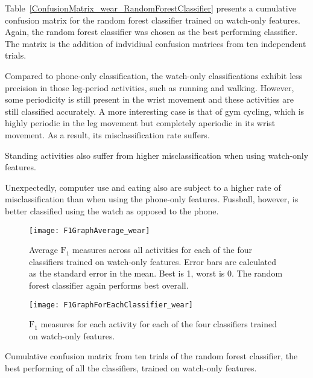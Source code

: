     Table~\ref{ConfusionMatrix_wear_RandomForestClassifier} presents a cumulative confusion matrix for the random forest classifier trained on watch-only features. Again, the random forest classifier was chosen as the best performing classifier. The matrix is the addition of indvidiual confusion matrices from ten independent trials.
    
    Compared to phone-only classification, the watch-only classifications exhibit less precision in those leg-period activities, such as running and walking. However, some periodicity is still present in the wrist movement and these activities are still classified accurately. A more interesting case is that of gym cycling, which is highly periodic in the leg movement but completely aperiodic in its wrist movement. As a result, its misclassification rate suffers.
    
    Standing activities also suffer from higher misclassification when using watch-only features.
    
    Unexpectedly, computer use and eating also are subject to a higher rate of misclassification than when using the phone-only features. Fussball, however, is better classified using the watch as opposed to the phone.
    \begin{figure}
      \centering
      \texttt{[image: F1GraphAverage\_wear]}
      \caption{Average $\mathrm{F}_1$ measures across all activities for each of the four classifiers trained on watch-only features. Error bars are calculated as the standard error in the mean. Best is 1, worst is 0. The random forest classifier again performs best overall.}
      \label{fig:F1GraphAverage_wear}
    \end{figure}

    \begin{figure}
      \centering
      \texttt{[image: F1GraphForEachClassifier\_wear]}
      \caption{$\mathrm{F}_1$ measures for each activity for each of the four classifiers trained on watch-only features.}
      \label{fig:F1GraphForEachClassifier_wear}
    \end{figure}
    
    \begin{table}
      \tabcolsep=0.11cm
      \centering
        
      \caption{Cumulative confusion matrix from ten trials of the random forest classifier, the best performing of all the classifiers, trained on watch-only features.}
      \label{tab:ConfusionMatrix_wear_RandomForestClassifier}
    \end{table}
    
